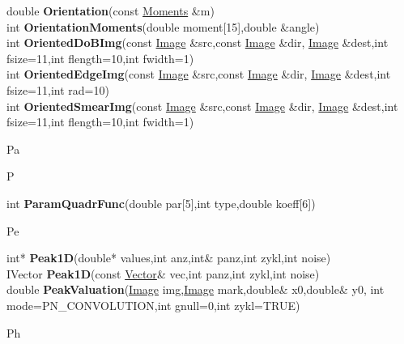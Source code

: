 \documentclass[10pt,titlepage]{article}
\def\functionlistentry#1#2#3#4#5#6{\noindent #1 {\bf #2}(#3) \dotfill #6\\}
\def\letterref#1{}
\def\letterlabel#1{\vspace{0.5cm}\centerline{\Large #1}}
\def\letterlabelend#1{}
\begin{document}
{{\letterref{Of}
\letterref{On}
\letterref{Op}
\letterref{Or}
\letterlabelend{Or}
\functionlistentry{double}{Orientation}{const \hyperlink{Moments}{Moments} \&m}{857}{moments}{}
\functionlistentry{int}{OrientationMoments}{double moment[15],double \&angle}{1274}{registration}{}
\functionlistentry{int}{OrientedDoBImg}{const \hyperlink{Image}{Image} \&src,const \hyperlink{Image}{Image} \&dir, \hyperlink{Image}{Image} \&dest,int fsize=11,int flength=10,int fwidth=1}{365}{filter}{}
\functionlistentry{int}{OrientedEdgeImg}{const \hyperlink{Image}{Image} \&src,const \hyperlink{Image}{Image} \&dir, \hyperlink{Image}{Image} \&dest,int fsize=11,int rad=10}{366}{filter}{}
\functionlistentry{int}{OrientedSmearImg}{const \hyperlink{Image}{Image} \&src,const \hyperlink{Image}{Image} \&dir, \hyperlink{Image}{Image} \&dest,int fsize=11,int flength=10,int fwidth=1}{364}{filter}{}

\letterlabel{Pa}
\letterlabel{P}
\letterref{A}
\letterref{B}
\letterref{C}
\letterref{D}
\letterref{E}
\letterref{F}
\letterref{G}
\letterref{H}
\letterref{I}
\letterref{K}
\letterref{L}
\letterref{M}
\letterref{N}
\letterref{O}
\letterref{P}
\letterref{Q}
\letterref{R}
\letterref{S}
\letterref{T}
\letterref{U}
\letterref{V}
\letterref{W}
\letterref{X}
\letterref{Y}
\letterref{Z}

\letterref{Pa}
\letterref{Pe}
\letterref{Ph}
\letterref{Po}
\letterref{Pr}
\letterref{Pu}
\letterlabelend{Pa}
\functionlistentry{int}{ParamQuadrFunc}{double par[5],int type,double koeff[6]}{1382}{numeric}{}

\letterlabel{Pe}
\letterref{A}
\letterref{B}
\letterref{C}
\letterref{D}
\letterref{E}
\letterref{F}
\letterref{G}
\letterref{H}
\letterref{I}
\letterref{K}
\letterref{L}
\letterref{M}
\letterref{N}
\letterref{O}
\letterref{P}
\letterref{Q}
\letterref{R}
\letterref{S}
\letterref{T}
\letterref{U}
\letterref{V}
\letterref{W}
\letterref{X}
\letterref{Y}
\letterref{Z}

\letterref{Pa}
\letterref{Pe}
\letterref{Ph}
\letterref{Po}
\letterref{Pr}
\letterref{Pu}
\letterlabelend{Pe}
\functionlistentry{int*}{Peak1D}{double* values,int anz,int\& panz,int zykl,int noise}{1256}{registration}{}
\functionlistentry{IVector}{Peak1D}{const \hyperlink{Vector}{Vector}\& vec,int panz,int zykl,int noise}{1257}{registration}{}
\functionlistentry{double}{PeakValuation}{\hyperlink{Image}{Image} img,\hyperlink{Image}{Image} mark,double\& x0,double\& y0, int mode=PN\_CONVOLUTION,int gnull=0,int zykl=TRUE}{1255}{registration}{}

\letterlabel{Ph}
\letterref{A}
\letterref{B}
\letterref{C}
\letterref{D}
\letterref{E}
\letterref{F}
\letterref{G}
\letterref{H}
\letterref{I}
\letterref{K}
\letterref{L}
\letterref{M}
\letterref{N}
\letterref{O}
\letterref{P}
\letterref{Q}
\letterref{R}
\letterref{S}
\letterref{T}
\letterref{U}
\letterref{V}
\letterref{W}
\letterref{X}
\letterref{Y}
\letterref{Z}

}}
\end{document}
